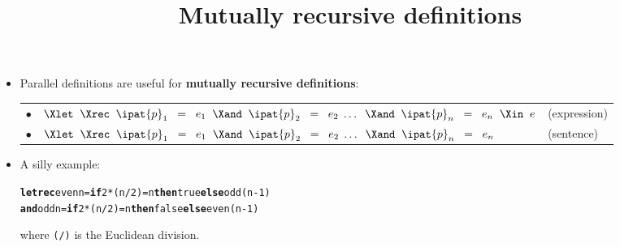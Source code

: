 \documentclass[wide]{slides}
\begin{document}
\begin{slide}
  \title{Mutually recursive definitions}

  \begin{itemize}

    \item Parallel definitions are useful for \textbf{mutually
      recursive definitions}:\\
      \smallskip
      \begin{tabular}{r@{\;}ll}
        $\bullet$
        & \(\Xlet \;\; \Xrec \;\; \ipat{p}_1 \;\; = \;\; e_1 \;\;
        \Xand \;\; \ipat{p}_2 \;\; = \;\; e_2 \; \ldots \;\; \Xand
        \;\; \ipat{p}_n \;\; = \;\; e_n \;\; \Xin \;\; e\) &
        (expression)\\
      $\bullet$
      & \(\Xlet \;\; \Xrec \;\; \ipat{p}_1 \;\; = \;\; e_1 \;\; \Xand
        \;\; \ipat{p}_2 \;\; = \;\; e_2 \; \ldots \;\; \Xand \;\;
        \ipat{p}_n \;\; = \;\; e_n\)
      & (sentence)
      \end{tabular}
      \smallskip

    \item A silly example:
      \smallskip
\begin{alltt}
\textbf{let} \textbf{rec} even n = \textbf{if} 2*(n/2) = n \textbf{then} true \textbf{else} odd (n-1)
\textbf{and} odd n = \textbf{if} 2*(n/2) = n \textbf{then} false \textbf{else} even (n-1)
\end{alltt}
     \smallskip
     \noindent where \texttt{(/)} is the Euclidean division.

  \end{itemize}

\end{slide}
\end{document}
